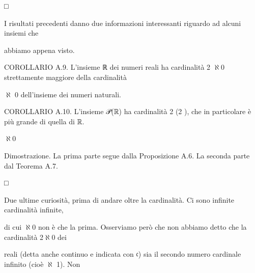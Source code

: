 \documentclass[a4paper,portrait,12pt]{article}
\begin{document}
□





\begin{flushleft}
I risultati precedenti danno due informazioni interessanti riguardo ad alcuni insiemi che
\end{flushleft}


\begin{flushleft}
abbiamo appena visto.
\end{flushleft}


\begin{flushleft}
COROLLARIO A.9. L'insieme ℝ dei numeri reali ha cardinalit\`{a} 2 $\aleph$0 strettamente maggiore della cardinalit\`{a}
\end{flushleft}


\begin{flushleft}
$\aleph$ 0 dell'insieme dei numeri naturali.
\end{flushleft}


\begin{flushleft}
COROLLARIO A.10. L'insieme 𝒫(ℝ) ha cardinalit\`{a} 2 (2 ), che in particolare \`{e} più grande di quella di ℝ.
\end{flushleft}


\begin{flushleft}
$\aleph$0
\end{flushleft}





\begin{flushleft}
Dimostrazione. La prima parte segue dalla Proposizione A.6. La seconda parte dal Teorema A.7.
\end{flushleft}


□


\begin{flushleft}
Due ultime curiosit\`{a}, prima di andare oltre la cardinalit\`{a}. Ci sono infinite cardinalit\`{a} infinite,
\end{flushleft}


\begin{flushleft}
di cui $\aleph$0 non \`{e} che la prima. Osserviamo per\`{o} che non abbiamo detto che la cardinalit\`{a} 2$\aleph$0 dei
\end{flushleft}


\begin{flushleft}
reali (detta anche continuo e indicata con 𝔠) sia il secondo numero cardinale infinito (cio\`{e} $\aleph$ 1). Non
\end{flushleft}
\end{document}
